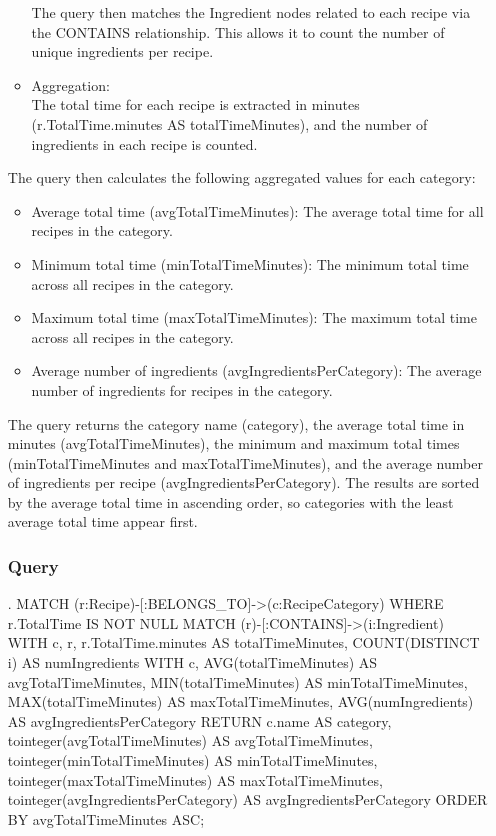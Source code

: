 \begin{enumerate}
\begin{itemize}
The query then matches the Ingredient nodes related to each recipe via the CONTAINS relationship. This allows it to count the number of unique ingredients per recipe.
    \item Aggregation:\\
The total time for each recipe is extracted in minutes (r.TotalTime.minutes AS totalTimeMinutes), and the number of ingredients in each recipe is counted.
    \end{itemize}
The query then calculates the following aggregated values for each category:
    \begin{itemize}
        \item Average total time (avgTotalTimeMinutes): The average total time for all recipes in the category.
        \item Minimum total time (minTotalTimeMinutes): The minimum total time across all recipes in the category.
        \item Maximum total time (maxTotalTimeMinutes): The maximum total time across all recipes in the category.
        \item Average number of ingredients (avgIngredientsPerCategory): The average number of ingredients for recipes in the category.
    \end{itemize}
The query returns the category name (category), the average total time in minutes (avgTotalTimeMinutes), the minimum and maximum total times (minTotalTimeMinutes and maxTotalTimeMinutes), and the average number of ingredients per recipe (avgIngredientsPerCategory).
The results are sorted by the average total time in ascending order, so categories with the least average total time appear first.\\
    \subsubsection{Query}
\begin{CypherQuery}
.
MATCH (r:Recipe)-[:BELONGS_TO]->(c:RecipeCategory)
WHERE r.TotalTime IS NOT NULL
MATCH (r)-[:CONTAINS]->(i:Ingredient)
WITH c, r, r.TotalTime.minutes AS totalTimeMinutes,
COUNT(DISTINCT i) AS numIngredients
WITH c, AVG(totalTimeMinutes) AS avgTotalTimeMinutes,
MIN(totalTimeMinutes) AS minTotalTimeMinutes,
MAX(totalTimeMinutes) AS maxTotalTimeMinutes,
AVG(numIngredients) AS avgIngredientsPerCategory
RETURN c.name AS category,
tointeger(avgTotalTimeMinutes) AS avgTotalTimeMinutes,
tointeger(minTotalTimeMinutes) AS minTotalTimeMinutes,
tointeger(maxTotalTimeMinutes) AS maxTotalTimeMinutes,
tointeger(avgIngredientsPerCategory) AS avgIngredientsPerCategory
ORDER BY avgTotalTimeMinutes ASC;
\end{CypherQuery}

\end{enumerate}
